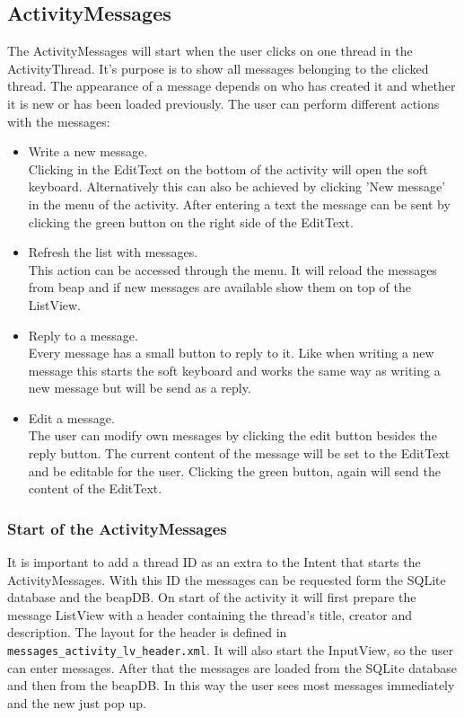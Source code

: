 \documentclass[12pt,a4paper,oneside]{report}
\newcommand{\code}[1]{\lstinline{#1}}
\begin{document}
\subsection{ActivityMessages}
The ActivityMessages will start when the user clicks on one thread in the ActivityThread. It's purpose is to show all messages belonging to the clicked thread. The appearance of a message depends on who has created it and whether it is new or has been loaded previously. The user can perform different actions with the messages:
\begin{itemize}
\item Write a new message.\\
Clicking in the EditText on the bottom of the activity will open the soft keyboard. Alternatively this can also be achieved by clicking 'New message' in the menu of the activity. After entering a text the message can be sent by clicking the green button on the right side of the EditText.

\item Refresh the list with messages.\\
This action can be accessed through the menu. It will reload the messages from beap and if new messages are available show them on top of the ListView.

\item Reply to a message.\\
Every message has a small button to reply to it. Like when writing a new message this starts the soft keyboard and works the same way as writing a new message but will be send as a reply.

\item Edit a message.\\
The user can modify own messages by clicking the edit button besides the reply button. The current content of the message will be set to the EditText and be editable for the user. Clicking the green button, again will send the content of the EditText. 

\end{itemize}

\subsubsection{Start of the ActivityMessages}
It is important to add a thread ID as an extra to the Intent that starts the ActivityMessages. With this ID the messages can be requested form the SQLite database and the beapDB. On start of the activity it will first prepare the message ListView with a header containing the thread's title, creator and description. The layout for the header is defined in \code{messages_activity_lv_header.xml}. It will also start the InputView, so the user can enter messages. After that the messages are loaded from the SQLite database and then from the beapDB. In this way the user sees most messages immediately and the new just pop up. 
\end{document}
